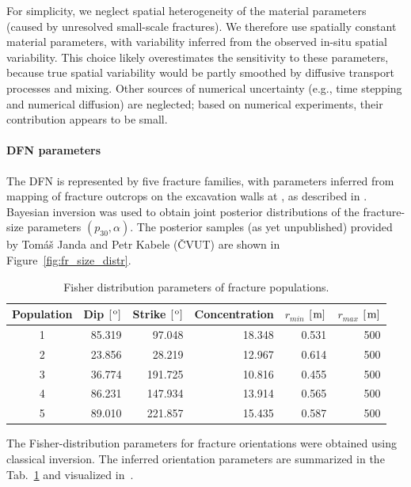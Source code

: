 For simplicity, we neglect spatial heterogeneity of the material parameters
(caused by unresolved small-scale fractures). We therefore use spatially
constant material parameters, with variability inferred from the observed
in-situ spatial variability. This choice likely overestimates the sensitivity
to these parameters, because true spatial variability would be partly smoothed
by diffusive transport processes and mixing. Other sources of numerical
uncertainty (e.g., time stepping and numerical diffusion) are neglected; based
on numerical experiments, their contribution appears to be small.

\paragraph{DFN parameters}
The DFN is represented by five fracture families, with parameters inferred from
mapping of fracture outcrops on the excavation walls at \URFB, as described in
\cite{ZunaEtal2024FractureConnectivityBukovURF}.
Bayesian inversion was used to obtain joint posterior distributions of the
fracture-size parameters $(p_{30}, \alpha)$.
The posterior samples (as yet unpublished) provided by Tomáš Janda and Petr
Kabele (ČVUT) are shown in Figure~\ref{fig:fr_size_distr}.

\begin{table}[ht]
    \caption{Fisher distribution parameters of fracture populations.}
    \label{tab:fisher_params}
    \centering
    \begin{tabular}{crrrrr}
    \toprule
    Population & Dip $[\hspace{1pt}\mathrm{^o}]$ & Strike $[\hspace{1pt}\mathrm{^o}]$ & Concentration & $r_{min}$ $[\hspace{1pt}\mathrm{m}]$ & $r_{max}$ $[\hspace{1pt}\mathrm{m}]$\\
    \midrule
    1 & 85.319 & 97.048  & 18.348 & 0.531 & 500 \\
    2 & 23.856 & 28.219  & 12.967 & 0.614 & 500 \\
    3 & 36.774 & 191.725 & 10.816 & 0.455 & 500 \\
    4 & 86.231 & 147.934 & 13.914 & 0.565 & 500 \\
    5 & 89.010 & 221.857 & 15.435 & 0.587 & 500 \\
    \bottomrule
    \end{tabular}
\end{table}

The Fisher-distribution parameters for fracture orientations were obtained using
classical inversion.
The inferred orientation parameters are summarized in the
Tab.~\ref{tab:fisher_params} and visualized in~.

